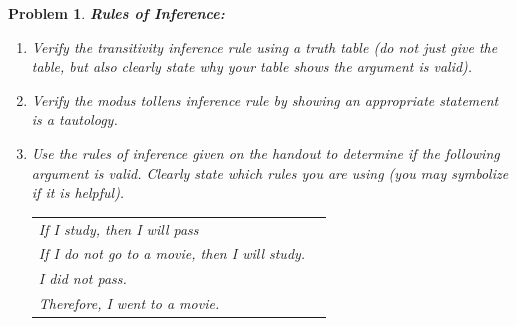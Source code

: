 \documentclass{article}
\newtheorem{problem}{Problem}
\theoremstyle{definition}
\begin{document}
\begin{problem}
\textbf{Rules of Inference:} 
\begin{enumerate}[label = \alph*)]
    \item Verify the transitivity inference rule using a truth table (do not just give the table, but also clearly state why your table shows the argument is valid).
    
    \item Verify the modus tollens inference rule by showing an appropriate statement is a tautology.
    
    \item Use the rules of inference given on the handout to determine if the following argument is valid. Clearly state which rules you are using (you may symbolize if it is helpful).
    \begin{center}
        \begin{tabular}{l c}
             If I study, then I will pass\\
             If I do not go to a movie, then I will study. \\
             I did not pass. \\ \hline
             Therefore, I went to a movie.
        \end{tabular}
    \end{center}
\end{enumerate}
\end{problem}
\end{document}
